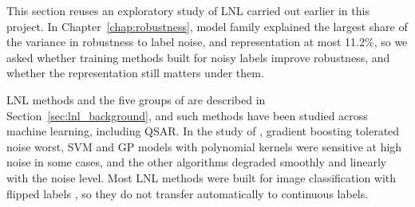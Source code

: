 %
%
This section reuses an exploratory study of LNL carried out earlier in this project. In Chapter~\ref{chap:robustness}, model family explained the largest share of the variance in robustness to label noise, and representation at most 11.2\%, so we asked whether training methods built for noisy labels improve robustness, and whether the representation still matters under them.

LNL methods and the five groups of \citet{Song2022} are described in Section~\ref{sec:lnl_background}, and such methods have been studied across machine learning, including QSAR. In the study of \citet{Cortes2015}, gradient boosting tolerated noise worst, SVM and GP models with polynomial kernels were sensitive at high noise in some cases, and the other algorithms degraded smoothly and linearly with the noise level. Most LNL methods were built for image classification with flipped labels \citep{Song2022}, so they do not transfer automatically to continuous labels.

